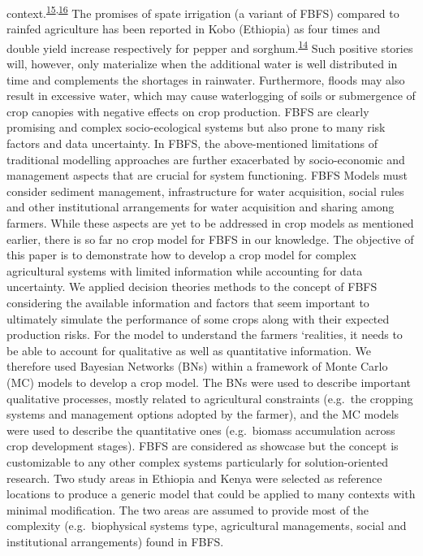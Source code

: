 \documentclass[11pt,preprint]{article}
\begin{document}
context.\textsuperscript{\protect\hyperlink{ref-Erkossa_et_al_2014}{15},\protect\hyperlink{ref-Hardaker_et_al_2015}{16}}
The promises of spate irrigation (a variant of FBFS) compared to rainfed
agriculture has been reported in Kobo (Ethiopia) as four times and
double yield increase respectively for pepper and
sorghum.\textsuperscript{\protect\hyperlink{ref-VanSteenbergen_et_al_2011}{14}}
Such positive stories will, however, only materialize when the
additional water is well distributed in time and complements the
shortages in rainwater. Furthermore, floods may also result in excessive
water, which may cause waterlogging of soils or submergence of crop
canopies with negative effects on crop production. FBFS are clearly
promising and complex socio-ecological systems but also prone to many
risk factors and data uncertainty. In FBFS, the above-mentioned
limitations of traditional modelling approaches are further exacerbated
by socio-economic and management aspects that are crucial for system
functioning. FBFS Models must consider sediment management,
infrastructure for water acquisition, social rules and other
institutional arrangements for water acquisition and sharing among
farmers. While these aspects are yet to be addressed in crop models as
mentioned earlier, there is so far no crop model for FBFS in our
knowledge. The objective of this paper is to demonstrate how to develop
a crop model for complex agricultural systems with limited information
while accounting for data uncertainty. We applied decision theories
methods to the concept of FBFS considering the available information and
factors that seem important to ultimately simulate the performance of
some crops along with their expected production risks. For the model to
understand the farmers `realities, it needs to be able to account for
qualitative as well as quantitative information. We therefore used
Bayesian Networks (BNs) within a framework of Monte Carlo (MC) models to
develop a crop model. The BNs were used to describe important
qualitative processes, mostly related to agricultural constraints
(e.g.~the cropping systems and management options adopted by the
farmer), and the MC models were used to describe the quantitative ones
(e.g.~biomass accumulation across crop development stages). FBFS are
considered as showcase but the concept is customizable to any other
complex systems particularly for solution-oriented research. Two study
areas in Ethiopia and Kenya were selected as reference locations to
produce a generic model that could be applied to many contexts with
minimal modification. The two areas are assumed to provide most of the
complexity (e.g.~biophysical systems type, agricultural managements,
social and institutional arrangements) found in FBFS.
\end{document}
